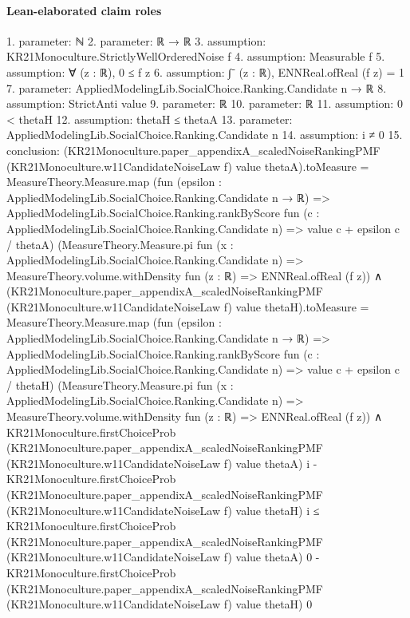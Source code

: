 \documentclass[10pt]{article}
\begin{document}
\paragraph{Lean-elaborated claim roles}\begin{ReviewVerbatim}
1. parameter: ℕ
2. parameter: ℝ → ℝ
3. assumption: KR21Monoculture.StrictlyWellOrderedNoise f
4. assumption: Measurable f
5. assumption: ∀ (z : ℝ), 0 ≤ f z
6. assumption: ∫⁻ (z : ℝ), ENNReal.ofReal (f z) = 1
7. parameter: AppliedModelingLib.SocialChoice.Ranking.Candidate n → ℝ
8. assumption: StrictAnti value
9. parameter: ℝ
10. parameter: ℝ
11. assumption: 0 < thetaH
12. assumption: thetaH ≤ thetaA
13. parameter: AppliedModelingLib.SocialChoice.Ranking.Candidate n
14. assumption: i ≠ 0
15. conclusion: (KR21Monoculture.paper_appendixA_scaledNoiseRankingPMF (KR21Monoculture.w11CandidateNoiseLaw f) value
        thetaA).toMeasure =
    MeasureTheory.Measure.map
      (fun (epsilon : AppliedModelingLib.SocialChoice.Ranking.Candidate n → ℝ) =>
        AppliedModelingLib.SocialChoice.Ranking.rankByScore
          fun (c : AppliedModelingLib.SocialChoice.Ranking.Candidate n) => value c + epsilon c / thetaA)
      (MeasureTheory.Measure.pi fun (x : AppliedModelingLib.SocialChoice.Ranking.Candidate n) =>
        MeasureTheory.volume.withDensity fun (z : ℝ) => ENNReal.ofReal (f z)) ∧
  (KR21Monoculture.paper_appendixA_scaledNoiseRankingPMF (KR21Monoculture.w11CandidateNoiseLaw f) value
          thetaH).toMeasure =
      MeasureTheory.Measure.map
        (fun (epsilon : AppliedModelingLib.SocialChoice.Ranking.Candidate n → ℝ) =>
          AppliedModelingLib.SocialChoice.Ranking.rankByScore
            fun (c : AppliedModelingLib.SocialChoice.Ranking.Candidate n) => value c + epsilon c / thetaH)
        (MeasureTheory.Measure.pi fun (x : AppliedModelingLib.SocialChoice.Ranking.Candidate n) =>
          MeasureTheory.volume.withDensity fun (z : ℝ) => ENNReal.ofReal (f z)) ∧
    KR21Monoculture.firstChoiceProb
          (KR21Monoculture.paper_appendixA_scaledNoiseRankingPMF (KR21Monoculture.w11CandidateNoiseLaw f) value thetaA)
          i -
        KR21Monoculture.firstChoiceProb
          (KR21Monoculture.paper_appendixA_scaledNoiseRankingPMF (KR21Monoculture.w11CandidateNoiseLaw f) value thetaH)
          i ≤
      KR21Monoculture.firstChoiceProb
          (KR21Monoculture.paper_appendixA_scaledNoiseRankingPMF (KR21Monoculture.w11CandidateNoiseLaw f) value thetaA)
          0 -
        KR21Monoculture.firstChoiceProb
          (KR21Monoculture.paper_appendixA_scaledNoiseRankingPMF (KR21Monoculture.w11CandidateNoiseLaw f) value thetaH)
          0
\end{ReviewVerbatim}
\end{document}
